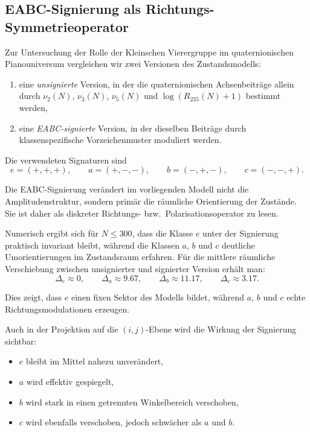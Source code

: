 \subsection{EABC-Signierung als Richtungs-Symmetrieoperator}
\label{subsec:eabc_signierung_richtungsoperator}

Zur Untersuchung der Rolle der Kleinschen Vierergruppe im quaternionischen Pianouniversum vergleichen wir zwei Versionen des Zustandsmodells:
\begin{enumerate}
	\item eine \emph{unsignierte} Version, in der die quaternionischen Achsenbeiträge allein durch \(\nu_2(N)\), \(\nu_3(N)\), \(\nu_5(N)\) und \(\log(R_{235}(N)+1)\) bestimmt werden,
	\item eine \emph{EABC-signierte} Version, in der dieselben Beiträge durch klassenspezifische Vorzeichenmuster moduliert werden.
\end{enumerate}

Die verwendeten Signaturen sind
\[
e=(+,+,+),\qquad
a=(+,-,-),\qquad
b=(-,+,-),\qquad
c=(-,-,+).
\]

\begin{bemerkung}
	Die EABC-Signierung verändert im vorliegenden Modell nicht die Amplitudenstruktur, sondern primär die räumliche Orientierung der Zustände.
	Sie ist daher als diskreter Richtungs- bzw.\ Polarisationsoperator zu lesen.
\end{bemerkung}

Numerisch ergibt sich für \(N\le 300\), dass die Klasse \(e\) unter der Signierung praktisch invariant bleibt, während die Klassen \(a\), \(b\) und \(c\) deutliche Umorientierungen im Zustandsraum erfahren.
Für die mittlere räumliche Verschiebung zwischen unsignierter und signierter Version erhält man:
\[
\Delta_e \approx 0,\qquad
\Delta_a \approx 9.67,\qquad
\Delta_b \approx 11.17,\qquad
\Delta_c \approx 3.17.
\]

Dies zeigt, dass \(e\) einen fixen Sektor des Modells bildet, während \(a\), \(b\) und \(c\) echte Richtungsmodulationen erzeugen.

Auch in der Projektion auf die \((i,j)\)-Ebene wird die Wirkung der Signierung sichtbar:
\begin{itemize}
	\item \(e\) bleibt im Mittel nahezu unverändert,
	\item \(a\) wird effektiv gespiegelt,
	\item \(b\) wird stark in einen getrennten Winkelbereich verschoben,
	\item \(c\) wird ebenfalls verschoben, jedoch schwächer als \(a\) und \(b\).
\end{itemize}

